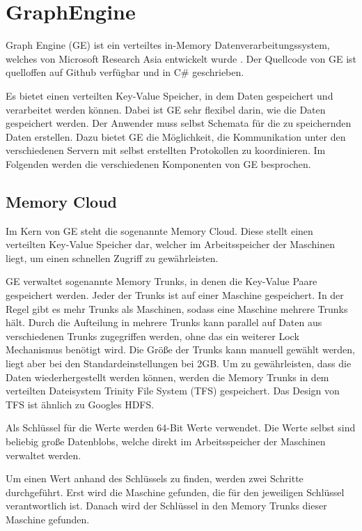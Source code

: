 \section{GraphEngine}

Graph Engine (GE) ist ein verteiltes in-Memory Datenverarbeitungssystem, welches von Microsoft Research Asia 
entwickelt wurde \cite{graphEngine}. Der Quellcode von GE ist quelloffen auf Github verfügbar und in C\# geschrieben.

Es bietet einen verteilten Key-Value Speicher, in dem Daten gespeichert und verarbeitet werden können. Dabei ist GE sehr flexibel darin, wie die Daten gespeichert werden. Der Anwender muss selbst
Schemata für die zu speichernden Daten erstellen. Dazu bietet GE die Möglichkeit, die Kommunikation unter den verschiedenen Servern mit selbst erstellten Protokollen zu koordinieren. Im Folgenden werden die verschiedenen Komponenten von GE besprochen.

\subsection{Memory Cloud}

Im Kern von GE steht die sogenannte Memory Cloud. Diese stellt einen verteilten Key-Value Speicher dar, welcher im Arbeitsspeicher der Maschinen
liegt, um einen schnellen Zugriff zu gewährleisten.

GE verwaltet sogenannte Memory Trunks, in denen die Key-Value Paare gespeichert werden. Jeder der Trunks ist auf einer Maschine gespeichert.
In der Regel gibt es mehr Trunks als Maschinen, sodass eine Maschine mehrere Trunks hält. Durch die Aufteilung in mehrere Trunks kann parallel auf Daten aus verschiedenen Trunks zugegriffen
werden, ohne das ein weiterer Lock Mechanismus benötigt wird. Die Größe der Trunks kann manuell gewählt werden, liegt aber bei den Standardeinstellungen bei 2GB.
Um zu gewährleisten, dass die Daten wiederhergestellt werden können, werden die Memory Trunks in dem verteilten Dateisystem Trinity File System (TFS) gespeichert. Das Design von TFS ist ähnlich zu Googles HDFS.

Als Schlüssel für die Werte werden 64-Bit Werte verwendet.
Die Werte selbst sind beliebig große Datenblobs, welche direkt im Arbeitsspeicher der Maschinen verwaltet werden.


Um einen Wert anhand des Schlüssels zu finden, werden zwei Schritte durchgeführt. Erst wird die Maschine gefunden, die für den jeweiligen Schlüssel
verantwortlich ist. Danach wird der Schlüssel in den Memory Trunks dieser Maschine gefunden.

